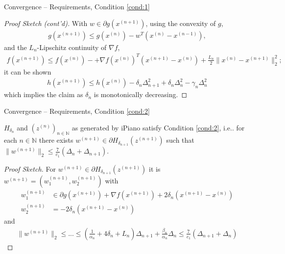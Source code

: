 \documentclass[t]{beamer}
\makeatletter
\DeclareRobustCommand\onedot{\futurelet\@let@token\@onedot}
\def\@onedot{\ifx\@let@token.\else.\null\fi\xspace}
\def\ie{{i.e}\onedot} \def\Ie{{I.e}\onedot}
\makeatother
\begin{document}
	\begin{frame}{Convergence -- Requirements, Condition \ref{cond:1}}
		\begin{proof}[Proof Sketch (cont'd)]
			With $w \in \partial g(x^{(n + 1)})$, using the convexity of $g$,
			\begin{align}
				g(x^{(n + 1)}) \leq g(x^{(n)}) - w^T(x^{(n)} - x^{(n - 1)}),
			\end{align}
			and the $L_n$-Lipschitz continuity of $\nabla f$,
			\begin{align}
				f(x^{(n + 1)}) \leq f(x^{(n)}) - + \nabla f(x^{(n)})^T(x^{(n + 1)} - x^{(n)}) + \frac{L_n}{2}\|x^{(n)} - x^{(n + 1)}\|_2^2;
			\end{align}
			it can be shown
			\begin{align}
				h(x^{(n + 1)}) \leq h(x^{(n)}) - \delta_n\Delta_{n + 1}^2 + \delta_n\Delta_n^2 - \gamma_n \Delta_n^2
			\end{align}
			which implies the claim as $\delta_n$ is monotonically decreasing.
		\end{proof}
	\end{frame}
	
	\begin{frame}{Convergence -- Requirements, Condition \ref{cond:2}}
		\begin{lemma}
			$H_{\delta_n}$ and $(z^{(n)})_{n \in \mathbb{N}}$ as generated by iPiano satisfy Condition \ref{cond:2}, \ie for each $n \in \mathbb{N}$ there exists $w^{(n + 1)} \in \partial H_{\delta_{n + 1}}(z^{(n + 1)})$ such that $\|w^{(n + 1)}\|_2 \leq \frac{7}{c_1}(\Delta_n + \Delta_{n + 1})$.
		\end{lemma}
		
		\pause
		\begin{proof}[Proof Sketch]
			For $w^{(n + 1)} \in \partial H_{\delta_{n + 1}}(z^{(n + 1)})$ it is $w^{(n + 1)} = (w_1^{(n + 1)}, w_2^{(n + 1)})$ with
			\begin{align}
				w_1^{(n + 1)} &\in \partial g(x^{(n + 1)}) + \nabla f(x^{(n + 1)}) + 2 \delta_n (x^{(n + 1)} - x^{(n)})\\
				w_2^{(n + 1)} &= -2\delta_n(x^{(n + 1)} - x^{(n)})
			\end{align}
			and
			\begin{align}
				\|w^{(n + 1)}\|_2 \leq ... \leq (\frac{1}{\alpha_n} + 4\delta_n + L_n)\Delta_{n + 1} + \frac{\beta_n}{\alpha_n} \Delta_n \leq \frac{7}{c_1}(\Delta_{n + 1} + \Delta_n)
			\end{align}
		\end{proof}
	\end{frame}
	
\end{document}
